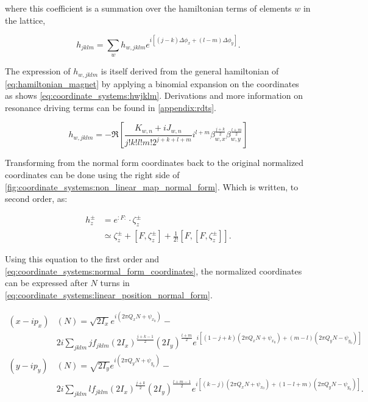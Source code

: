 where this coefficient is a summation over the hamiltonian terms of elements $w$ in the lattice,

\begin{equation}
    h_{jklm} = \sum_w h_{w,jklm} e^{i [(j-k)\Delta \phi_x + (l-m) \Delta \phi_y]}.
\end{equation}

The expression of $h_{w,jklm}$ is itself derived from the general hamiltonian 
of \cref{eq:hamiltonian_magnet} by applying a binomial expansion on the
coordinates~\cite{franchi_studies_2006} as shows \cref{eq:coordinate_systems:hwjklm}.
Derivations and more information on resonance driving terms can be found in \cref{appendix:rdts}.

\begin{equation}
    h_{w,jklm} = -\Re \left[\frac{K_{w,n} + iJ_{w,n}}{j!k!l!m! 2^{j+k+l+m}}
    i^{l+m} \beta_{w,x}^{\frac{j+k}{2}} \beta_{w,y}^{\frac{l+m}{2}} \right]
    \label{eq:coordinate_systems:hwjklm}
\end{equation}

Transforming from the normal form coordinates back to the original normalized coordinates can be
done using the right side of \cref{fig:coordinate_systems:non_linear_map_normal_form}. Which is
written, to second order, as:

\begin{equation}
    \begin{aligned}
        h_z^{ \pm} &= e^{: F:} \cdot \zeta_z^{ \pm} \\
                   &\simeq \zeta_z^{ \pm}+\left[F, \zeta_z^{ \pm}\right] 
                        + \frac{1}{2!} \left[ F, \left[ F, \zeta_z^\pm \right]\right].
    \end{aligned}
\end{equation}

Using this equation to the first order and \cref{eq:coordinate_systems:normal_form_coordinates}, the
normalized coordinates can be expressed after $N$ turns in
\cref{eq:coordinate_systems:linear_position_normal_form}.

\small
\begin{equation}
    \begin{aligned}
    (x-ip_x)&(N)= \sqrt{2 I_x} e^{i\left(2 \pi Q_x N+\psi_{x_0}\right)}- \\
    & 2 i \sum_{j k l m} j f_{j k l m}\left(2 I_x\right)^{\frac{j+k-1}{2}}\left(2 I_y\right)^{\frac{l+m}{2}} e^{i\left[(1-j+k)\left(2 \pi Q_x N+\psi_{x_0}\right)+(m-l)\left(2 \pi Q_y N-\psi_{y_0}\right)\right]} \\
    (y-ip_y)&(N)= \sqrt{2 I_y} e^{i\left(2 \pi Q_y N+\psi_{y_0}\right)}- \\
    & 2 i \sum_{j k l m} l f_{j k l m}\left(2 I_x\right)^{\frac{j+k}{2}}\left(2 I_y\right)^{\frac{l+m-1}{2}} e^{i\left[(k-j)\left(2 \pi Q_x N+\psi_{x_0}\right)+(1-l+m)\left(2 \pi Q_y N-\psi_{y_0}\right)\right]} .
    \end{aligned}
    \label{eq:coordinate_systems:linear_position_normal_form}
\end{equation}
\normalsize

